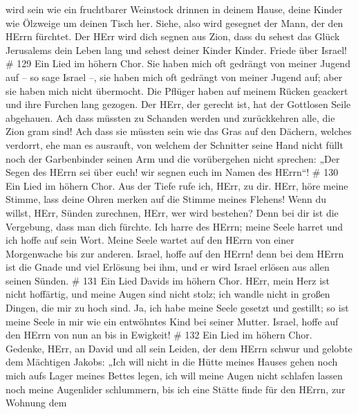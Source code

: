 wird sein wie ein fruchtbarer Weinstock drinnen in deinem Hause, deine
Kinder wie Ölzweige um deinen Tisch her.  Siehe, also wird
gesegnet der Mann, der den HErrn fürchtet.  Der HErr wird
dich segnen aus Zion, dass du sehest das Glück Jerusalems dein Leben
lang  und sehest deiner Kinder Kinder. Friede über Israel!
\# 129  Ein Lied im höhern Chor. Sie haben mich oft gedrängt
von meiner Jugend auf -- so sage Israel --,  sie haben mich
oft gedrängt von meiner Jugend auf; aber sie haben mich nicht übermocht.
 Die Pflüger haben auf meinem Rücken geackert und ihre
Furchen lang gezogen.  Der HErr, der gerecht ist, hat der
Gottlosen Seile abgehauen.  Ach dass müssten zu Schanden
werden und zurückkehren alle, die Zion gram sind!  Ach dass
sie müssten sein wie das Gras auf den Dächern, welches verdorrt, ehe man
es ausrauft,  von welchem der Schnitter seine Hand nicht
füllt noch der Garbenbinder seinen Arm  und die vorübergehen
nicht sprechen: „Der Segen des HErrn sei über euch! wir segnen euch im
Namen des HErrn``! \# 130  Ein Lied im höhern Chor. Aus der
Tiefe rufe ich, HErr, zu dir.  HErr, höre meine Stimme, lass
deine Ohren merken auf die Stimme meines Flehens!  Wenn du
willst, HErr, Sünden zurechnen, HErr, wer wird bestehen? 
Denn bei dir ist die Vergebung, dass man dich fürchte.  Ich
harre des HErrn; meine Seele harret und ich hoffe auf sein Wort.
 Meine Seele wartet auf den HErrn von einer Morgenwache bis
zur anderen.  Israel, hoffe auf den HErrn! denn bei dem
HErrn ist die Gnade und viel Erlösung bei ihm,  und er wird
Israel erlösen aus allen seinen Sünden. \# 131  Ein Lied
Davids im höhern Chor. HErr, mein Herz ist nicht hoffärtig, und meine
Augen sind nicht stolz; ich wandle nicht in großen Dingen, die mir zu
hoch sind.  Ja, ich habe meine Seele gesetzt und gestillt;
so ist meine Seele in mir wie ein entwöhntes Kind bei seiner Mutter.
 Israel, hoffe auf den HErrn von nun an bis in Ewigkeit! \#
132  Ein Lied im höhern Chor. Gedenke, HErr, an David und
all sein Leiden,  der dem HErrn schwur und gelobte dem
Mächtigen Jakobs:  „Ich will nicht in die Hütte meines
Hauses gehen noch mich aufs Lager meines Bettes legen,  ich
will meine Augen nicht schlafen lassen noch meine Augenlider schlummern,
 bis ich eine Stätte finde für den HErrn, zur Wohnung dem
